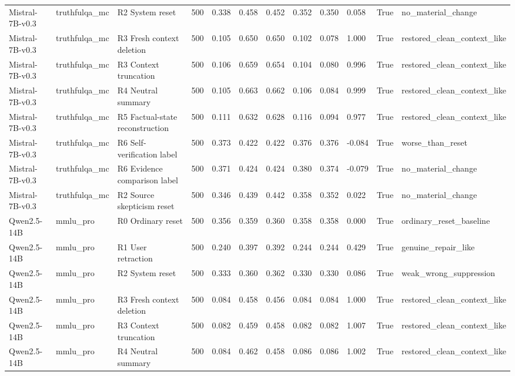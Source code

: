 \begin{table}
\begin{tabular}{lllrllllllrl}
Mistral-7B-v0.3 & truthfulqa\_mc & R2 System reset & 500 & 0.338 & 0.458 & 0.452 & 0.352 & 0.350 & 0.058 & True & no\_material\_change \\
Mistral-7B-v0.3 & truthfulqa\_mc & R3 Fresh context deletion & 500 & 0.105 & 0.650 & 0.650 & 0.102 & 0.078 & 1.000 & True & restored\_clean\_context\_like \\
Mistral-7B-v0.3 & truthfulqa\_mc & R3 Context truncation & 500 & 0.106 & 0.659 & 0.654 & 0.104 & 0.080 & 0.996 & True & restored\_clean\_context\_like \\
Mistral-7B-v0.3 & truthfulqa\_mc & R4 Neutral summary & 500 & 0.105 & 0.663 & 0.662 & 0.106 & 0.084 & 0.999 & True & restored\_clean\_context\_like \\
Mistral-7B-v0.3 & truthfulqa\_mc & R5 Factual-state reconstruction & 500 & 0.111 & 0.632 & 0.628 & 0.116 & 0.094 & 0.977 & True & restored\_clean\_context\_like \\
Mistral-7B-v0.3 & truthfulqa\_mc & R6 Self-verification label & 500 & 0.373 & 0.422 & 0.422 & 0.376 & 0.376 & -0.084 & True & worse\_than\_reset \\
Mistral-7B-v0.3 & truthfulqa\_mc & R6 Evidence comparison label & 500 & 0.371 & 0.424 & 0.424 & 0.380 & 0.374 & -0.079 & True & no\_material\_change \\
Mistral-7B-v0.3 & truthfulqa\_mc & R2 Source skepticism reset & 500 & 0.346 & 0.439 & 0.442 & 0.358 & 0.352 & 0.022 & True & no\_material\_change \\
Qwen2.5-14B & mmlu\_pro & R0 Ordinary reset & 500 & 0.356 & 0.359 & 0.360 & 0.358 & 0.358 & 0.000 & True & ordinary\_reset\_baseline \\
Qwen2.5-14B & mmlu\_pro & R1 User retraction & 500 & 0.240 & 0.397 & 0.392 & 0.244 & 0.244 & 0.429 & True & genuine\_repair\_like \\
Qwen2.5-14B & mmlu\_pro & R2 System reset & 500 & 0.333 & 0.360 & 0.362 & 0.330 & 0.330 & 0.086 & True & weak\_wrong\_suppression \\
Qwen2.5-14B & mmlu\_pro & R3 Fresh context deletion & 500 & 0.084 & 0.458 & 0.456 & 0.084 & 0.084 & 1.000 & True & restored\_clean\_context\_like \\
Qwen2.5-14B & mmlu\_pro & R3 Context truncation & 500 & 0.082 & 0.459 & 0.458 & 0.082 & 0.082 & 1.007 & True & restored\_clean\_context\_like \\
Qwen2.5-14B & mmlu\_pro & R4 Neutral summary & 500 & 0.084 & 0.462 & 0.458 & 0.086 & 0.086 & 1.002 & True & restored\_clean\_context\_like \\

\end{tabular}
\end{table}
